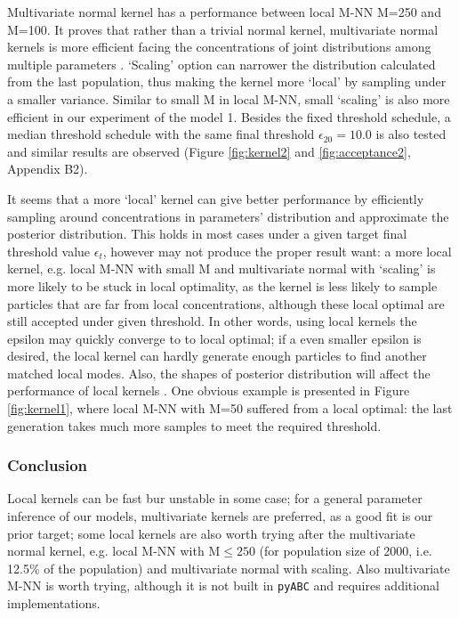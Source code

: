 \documentclass[12pt,a4paper]{report}
\begin{document}
Multivariate normal kernel has a performance between local M-NN M=250 and M=100. It proves that rather than a trivial normal kernel, multivariate normal kernels is more efficient facing the concentrations of joint distributions among multiple parameters \cite{ref:kernel}. `Scaling' option can narrower the distribution calculated from the last population, thus making the kernel more `local' by sampling under a smaller variance. Similar to small M in local M-NN, small `scaling' is also more efficient in our experiment of the model 1. Besides the fixed threshold schedule, a median threshold schedule with the same final threshold $\epsilon_{20}=10.0$ is also tested and similar results are observed (Figure \ref{fig:kernel2} and \ref{fig:acceptance2}, Appendix B2).

It seems that a more `local' kernel can give better performance by efficiently sampling around concentrations in parameters' distribution and approximate the posterior distribution. This holds in most cases under a given target final threshold value $\epsilon_t$, however may not produce the proper result want: a more local kernel, e.g. local M-NN with small M and multivariate normal with `scaling' is more likely to be stuck in local optimality, as the kernel is less likely to sample particles that are far from local concentrations, although these local optimal are still accepted under given threshold. In other words, using local kernels the epsilon may quickly converge to to local optimal; if a even smaller epsilon is desired, the local kernel can hardly generate enough particles to find another matched local modes. Also, the shapes of posterior distribution will affect the performance of local kernels \cite{ref:kernel}. One obvious example is presented in Figure \ref{fig:kernel1}, where local M-NN with M=50 suffered from a local optimal: the last generation takes much more samples to meet the required threshold.

\subsubsection{Conclusion} Local kernels can be fast bur unstable in some case; for a general parameter inference of our models, multivariate kernels are preferred, as a good fit is our prior target; some local kernels are also worth trying after the multivariate normal kernel, e.g. local M-NN with M$\leq 250$ (for population size of 2000, i.e. 12.5\% of the population) and multivariate normal with scaling. Also multivariate M-NN is worth trying, although it is not built in \verb|pyABC| and requires additional implementations.
\end{document}

